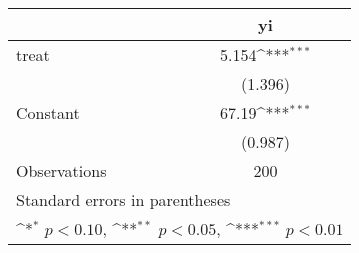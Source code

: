{
\def\sym#1{\ifmmode^{#1}\else\(^{#1}\)\fi}
\begin{tabular}{l*{1}{c}}
\hline\hline
                    &\multicolumn{1}{c}{yi}\\
\hline
treat               &       5.154\sym{***}\\
                    &     (1.396)         \\
[1em]
Constant            &       67.19\sym{***}\\
                    &     (0.987)         \\
\hline
Observations        &         200         \\
\hline\hline
\multicolumn{2}{l}{\footnotesize Standard errors in parentheses}\\
\multicolumn{2}{l}{\footnotesize \sym{*} \(p<0.10\), \sym{**} \(p<0.05\), \sym{***} \(p<0.01\)}\\
\end{tabular}
}
